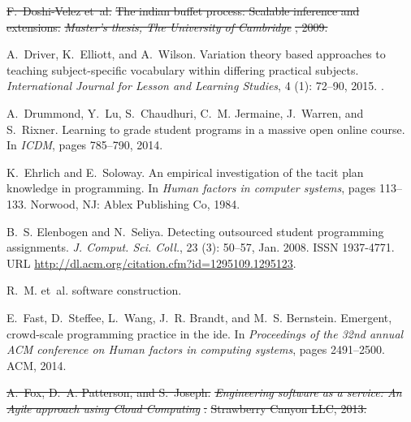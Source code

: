 \documentclass[12pt,twoside]{mitthesis}
\providecommand{\DIFdeltex}[1]{{\protect\color{red}\sout{#1}}}                      %
\providecommand{\DIFdelbegin}{} %
\providecommand{\DIFdelend}{} %
\providecommand{\DIFdel}[1]{\texorpdfstring{\DIFdeltex{#1}}{}} %
\begin{document}
{{{{{{{{{{\begin{thebibliography}{135}
\DIFdelbegin %
\DIFdel{F.~Doshi-Velez et~al.
}%
\DIFdel{The indian buffet process: Scalable inference and extensions.
}%
\emph{\DIFdel{Master's thesis, The University of Cambridge}}%
\DIFdel{, 2009.
}%

\DIFdelend {}
A.~Driver, K.~Elliott, and A.~Wilson.
\newblock Variation theory based approaches to teaching subject-specific
  vocabulary within differing practical subjects.
\newblock \emph{International Journal for Lesson and Learning Studies},
  4 (1): 72--90, 2015.
\newblock {}.

A.~Drummond, Y.~Lu, S.~Chaudhuri, C.~M. Jermaine, J.~Warren, and S.~Rixner.
\newblock Learning to grade student programs in a massive open online course.
\newblock In \emph{ICDM}, pages 785--790, 2014.

K.~Ehrlich and E.~Soloway.
\newblock An empirical investigation of the tacit plan knowledge in
  programming.
\newblock In \emph{Human factors in computer systems}, pages 113--133. Norwood,
  NJ: Ablex Publishing Co, 1984.

B.~S. Elenbogen and N.~Seliya.
\newblock Detecting outsourced student programming assignments.
\newblock \emph{J. Comput. Sci. Coll.}, 23 (3): 50--57, Jan.
  2008.
\newblock ISSN 1937-4771.
\newblock URL \url{http://dl.acm.org/citation.cfm?id=1295109.1295123}.

R.~M. et~al.
 software construction.

E.~Fast, D.~Steffee, L.~Wang, J.~R. Brandt, and M.~S. Bernstein.
\newblock Emergent, crowd-scale programming practice in the ide.
\newblock In \emph{Proceedings of the 32nd annual ACM conference on Human
  factors in computing systems}, pages 2491--2500. ACM, 2014.

\DIFdelbegin %
\DIFdel{A.~Fox, D.~A. Patterson, and S.~Joseph.
}%
\emph{\DIFdel{Engineering software as a service: An Agile approach using
  Cloud Computing}}%
\DIFdel{.
}%
\DIFdel{Strawberry Canyon LLC, 2013.
}%


\end{thebibliography}}}}}}}}}}}
\end{document}
